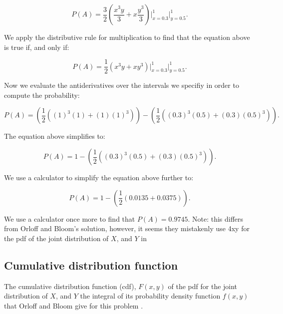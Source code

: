 \documentclass[a4paper,11pt]{article}
\begin{document}
\begin{equation}
P \left( A \right) =
  \frac{3}{2}\left(\frac{x^3y}{3}
    + x\frac{y^3}{3} \right) \bigg\rvert_{x=0.3}^{1} \bigg\rvert_{y=0.5}^{1}.
\end{equation}

We apply the distributive rule for multiplication to find that the equation
above is true if, and only if:

\begin{equation}
P \left( A \right) =
  \frac{1}{2}\left(x^3y
    + xy^3 \right) \bigg\rvert_{x=0.3}^{1} \bigg\rvert_{y=0.5}^{1}.
\end{equation}


Now we evaluate the antiderivatives over the intervals we specifiy in order
to compute the probability:

\begin{equation}
P \left( A \right) =
\left(  \frac{1}{2}\left(\left(1 \right)^3 \left(1 \right)
    + \left( 1 \right) \left(1 \right)^3 \right) \right) -
\left(  \frac{1}{2}\left(\left(0.3 \right)^3 \left(0.5 \right)
    + \left( 0.3 \right) \left(0.5 \right)^3 \right) \right).
\end{equation}

The equation above simplifies to:

\begin{equation}
P \left( A \right) =
1 -
\left(  \frac{1}{2}\left(\left(0.3 \right)^3 \left(0.5 \right)
    + \left( 0.3 \right) \left(0.5 \right)^3 \right) \right).
\end{equation}

We use a calculator to simplify the equation above further to:


\begin{equation}
P \left( A \right) =
1 -
\left(  \frac{1}{2} \left( 0.0135 +  0.0375 \right) \right).
\end{equation}

We use a calculator once more to find that $P\left( A \right) = 0.9745$.
Note: this differs from Orloff and Bloom's solution, however, it seems they
mistakenly use 4xy for the pdf of the joint distribution of $X$, and $Y$ in
\cite{slides7}

\subsection{Cumulative distribution function}

The cumulative distribution function (cdf), $F \left( x, y \right)$ of the pdf
for the joint distribution of $X$, and $Y$ the integral of its probability
density function $f\left(x, y \right)$ that Orloff and Bloom give for this
problem \cite{reading7}.
\end{document}
